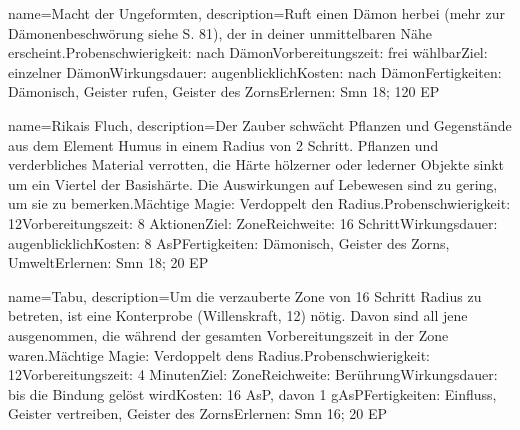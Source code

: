 {
    name={Macht der Ungeformten},
    description={Ruft einen Dämon herbei (mehr zur Dämonenbeschwörung siehe S. 81), der in deiner unmittelbaren Nähe erscheint.\newline Probenschwierigkeit: nach Dämon\newline Vorbereitungszeit: frei wählbar\newline Ziel: einzelner Dämon\newline Wirkungsdauer: augenblicklich\newline Kosten: nach Dämon\newline Fertigkeiten: Dämonisch, Geister rufen, Geister des Zorns\newline Erlernen: Smn 18; 120 EP}
}


{
    name={Rikais Fluch},
    description={Der Zauber schwächt Pflanzen und Gegenstände aus dem Element Humus in einem Radius von 2 Schritt. Pflanzen und verderbliches Material verrotten, die Härte hölzerner oder lederner Objekte sinkt um ein Viertel der Basishärte. Die Auswirkungen auf Lebewesen sind zu gering, um sie zu bemerken.\newline Mächtige Magie: Verdoppelt den Radius.\newline Probenschwierigkeit: 12\newline Vorbereitungszeit: 8 Aktionen\newline Ziel: Zone\newline Reichweite: 16 Schritt\newline Wirkungsdauer: augenblicklich\newline Kosten: 8 AsP\newline Fertigkeiten: Dämonisch, Geister des Zorns, Umwelt\newline Erlernen: Smn 18; 20 EP}
}


{
    name={Tabu},
    description={Um die verzauberte Zone von 16 Schritt Radius zu betreten, ist eine Konterprobe (Willenskraft, 12) nötig. Davon sind all jene ausgenommen, die während der gesamten Vorbereitungszeit in der Zone waren.\newline Mächtige Magie: Verdoppelt dens Radius.\newline Probenschwierigkeit: 12\newline Vorbereitungszeit: 4 Minuten\newline Ziel: Zone\newline Reichweite: Berührung\newline Wirkungsdauer: bis die Bindung gelöst wirdKosten: 16 AsP, davon 1 gAsP\newline Fertigkeiten: Einfluss, Geister vertreiben, Geister des Zorns\newline Erlernen: Smn 16; 20 EP}
}


